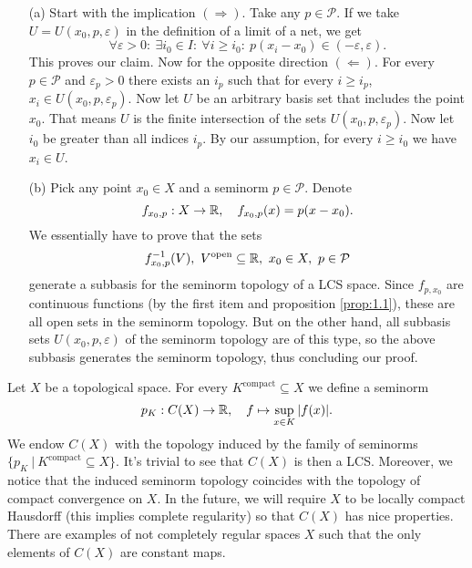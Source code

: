 \begin{myproof}
    \begin{itemize}
      \item[(a)] Start with the implication $(\Rightarrow)$. Take any $p \in \mathcal{P}$.
      If we take $U = U(x_0, p, \varepsilon)$ in the definition of a limit of a net, we get 
      $$\forall \varepsilon > 0:\ \exists i_0 \in I:\ \forall i \geq i_0:\ p(x_i - x_0) \in (-\varepsilon, \varepsilon).$$
      This proves our claim. Now for the opposite direction $(\Leftarrow)$. For every $p \in \mathcal{P}$ and 
      $\varepsilon_p > 0$ there exists an $i_p$ such that for every $i \geq i_p$, $x_i \in U(x_0, p, \varepsilon_p)$.
      Now let $U$ be an arbitrary basis set that includes the point $x_0$. That means $U$ is the finite intersection of the sets 
      $U(x_0, p, \varepsilon_p)$. Now let $i_0$ be greater than all indices $i_p$. By our assumption, 
      for every $i \geq i_0$ we have $x_i \in U$.
      \item[(b)] Pick any point $x_0 \in X$ and a seminorm $p \in \mathcal{P}$. Denote $$f_{x_0, p}: X \to \mathbb {R},\quad f_{x_0, p}(x) = p(x - x_0).$$
      We essentially have to prove that the sets
      $$f_{x_0, p}^{-1} (V),\ V^{\textrm{open}} \subseteq \mathbb {R},\ x_0 \in X,\ p \in \mathcal{P}$$
      generate a subbasis for the seminorm topology of a LCS space.
      Since $f_{p, x_0}$ are continuous functions (by the first item and proposition \ref{prop:1.1}),
      these are all open sets in the seminorm topology. But on the other hand, all subbasis sets $U(x_0, p, \varepsilon)$
      of the seminorm topology are of this type, so the above subbasis generates the seminorm topology, thus concluding our proof. \qedhere
    \end{itemize}
\end{myproof}

\begin{example}\label{ex:1.3}
    Let $X$ be a topological space.
        For every $K^\textrm{compact} \subseteq X$ we define a seminorm 
        $$p_K: C (X) \to \mathbb {R},\quad f \mapsto \sup_{x \in K} |f(x)|.$$
        We endow $C (X)$ with the topology induced by the family of seminorms $\{p_K\ |\ K^{\textrm{compact}} \subseteq X\}$. 
        It's trivial to see that $C(X)$ is then a LCS. Moreover, we notice that the induced seminorm topology
        coincides with the topology of compact convergence on $X$. In the future, we will require $X$ to be locally compact Hausdorff (this implies complete regularity)
        so that $C(X)$ has nice properties.
        There are examples of not completely regular spaces $X$ such that the only elements of $C(X)$ are constant maps.
\end{example}

